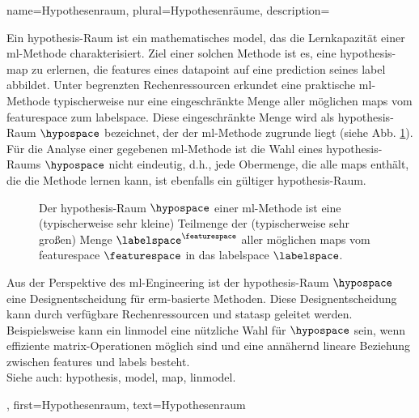 {{{{
{
name={Hypothesenraum}, plural={Hypothesenräume}, 
description={Ein \gls{hypothesis}-Raum ist ein mathematisches \gls{model}, 
das die Lernkapazität einer \gls{ml}-Methode charakterisiert. Ziel einer solchen Methode ist es, 
eine \gls{hypothesis}-\gls{map} zu erlernen, die \glspl{feature} eines \gls{datapoint} auf eine 
\gls{prediction} seines \gls{label} abbildet. Unter begrenzten Rechenressourcen erkundet eine praktische \gls{ml}-Methode typischerweise nur eine eingeschränkte Menge aller möglichen \glspl{map} vom \gls{featurespace} zum \gls{labelspace}. Diese eingeschränkte Menge wird als \gls{hypothesis}-Raum $\hypospace$ bezeichnet, der der \gls{ml}-Methode zugrunde liegt (siehe Abb. \ref{fig_hypospace_dict}). 
Für die Analyse einer gegebenen \gls{ml}-Methode ist die Wahl eines \gls{hypothesis}-Raums $\hypospace$ nicht eindeutig, d.h., jede Obermenge, die alle \glspl{map} enthält, die die Methode lernen kann, ist ebenfalls ein gültiger \gls{hypothesis}-Raum. 
\begin{figure}[H]
\begin{center}
\end{center}
\caption{Der \gls{hypothesis}-Raum $\hypospace$ einer \gls{ml}-Methode ist eine (typischerweise sehr kleine) Teilmenge der (typischerweise sehr großen) Menge $\labelspace^{\featurespace}$ aller möglichen \glspl{map} vom \gls{featurespace} $\featurespace$ in das \gls{labelspace} $\labelspace$. \label{fig_hypospace_dict}}
\end{figure}
Aus der Perspektive des \gls{ml}-Engineering ist der \gls{hypothesis}-Raum $\hypospace$ eine Designentscheidung für \gls{erm}-basierte Methoden. Diese Designentscheidung kann durch verfügbare Rechenressourcen und \gls{statasp} geleitet werden. Beispielsweise kann ein \gls{linmodel} eine nützliche Wahl für $\hypospace$ sein, wenn effiziente \gls{matrix}-Operationen möglich sind und eine annähernd lineare Beziehung zwischen \glspl{feature} und \glspl{label} besteht.\\
Siehe auch: \gls{hypothesis}, \gls{model}, \gls{map}, \gls{linmodel}.
},
first={Hypothesenraum},
text={Hypothesenraum}
}

}}}}
